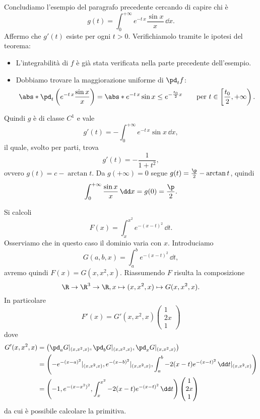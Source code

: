 \begin{ese}
	Concludiamo l'esempio del paragrafo precedente cercando di capire chi è
	\[
		g(t)= \int_0^{+\infty} e^{-t\,x} \frac{\sin x}{x}\,\dd x.
	\]
	Affermo che \(g'(t)\) esiste per ogni \(t>0\). Verifichiamolo tramite le ipotesi del teorema:
	\begin{itemize}
		\item L'integrabilità di \(f\) è già stata verificata nella parte precedente dell'esempio.
		\item Dobbiamo trovare la maggiorazione uniforme di \(\pd_t f\):
		      \[
			      \abs*{\pd_t \left( e^{-t\,x} \frac{\sin x}{x} \right)} = \abs*{e^{-t\,x}\sin x} \le e^{-\frac{t_0}{2}x} \qquad\text{per }t\in \left[\frac{t_0}{2},+\infty\right).
		      \]
	\end{itemize}
	Quindi \(g\) è di classe \(C^1\) e vale
	\[
		g'(t) = -\int_0^{+\infty} e^{-t\,x} \sin x\,\dd x,
	\]
	il quale, svolto per parti, trova
	\[
		g'(t) = -\frac{1}{1+t^2},
	\]
	ovvero \(g(t)= c-\arctan t\).
	Da \(g(+\infty)= 0\) segue \(g(t)=\frac{\p}{2}-\arctan t\), quindi
	\[
		\int_0^{+\infty} \frac{\sin x}{x}\,\dd x = g(0) = \frac{\p}{2}.
	\]
\end{ese}
%
%
\begin{ese}
	Si calcoli
	\[
		F(x) = \int_x^{x^2} e^{-(x-t)^2}\,\dd t.
	\]
	Osserviamo che in questo caso il dominio varia con \(x\).
	Introduciamo
	\[
		G(a,b,x) = \int_a^b e^{-(x-t)^2}\,\dd t,
	\]
	avremo quindi \(F(x)=G(x,x^2,x)\).
	Riassumendo \(F\) risulta la composizione
	\[
		\R \to \R^3 \to \R, x\mapsto (x,x^2,x) \mapsto G(x,x^2,x).
	\]
	In particolare
	\[
		F'(x) = G'(x,x^2,x) \begin{pmatrix}
			1  \\
			2x \\
			1
		\end{pmatrix}
	\]
	dove
	\[
		\begin{split}
			G'(x,x^2,x) & = \big( \pd_a G|_{(x,x^2,x)}, \pd_b G|_{(x,x^2,x)}, \pd_x G|_{(x,x^2,x)}\big)\\
			& = \left(-e^{-(x-a)^2}|_{(x,x^2,x)}, e^{-(x-b)^2}|_{(x,x^2,x)}, \int_a^b -2(x-t) e^{-(x-t)^2}\,\dd t|_{(x,x^2,x)} \right)\\
			& = \left(-1,e^{-(x-x^2)^2},\int_x^{x^2} -2(x-t) e^{-(x-t)^2}\,\dd t\right) 	\begin{pmatrix}
				1  \\
				2x \\
				1
			\end{pmatrix}
		\end{split}
	\]
	da cui è possibile calcolare la primitiva.
\end{ese}
